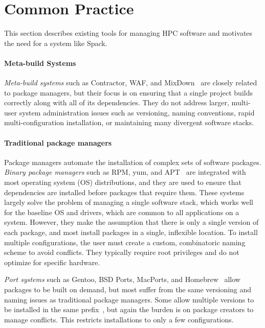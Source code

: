 
\section{Common Practice}
\label{sec:motivation}

This section describes existing tools for managing HPC 
software and motivates the need for a system like Spack.

\paragraph{Meta-build Systems}

{\it Meta-build systems} such as Contractor, WAF, and
MixDown~\cite{amundson:contractor,epperly+:mixdown,nagy:waf} are closely
related to package managers, but their focus is on ensuring that a single
project builds correctly along with all of its dependencies.  They do not address
larger, multi-user system administration issues such as versioning, naming
conventions, rapid multi-configuration installation, or maintaining many
divergent software stacks.

\paragraph{Traditional package managers}
Package managers automate the installation of complex sets of software packages.
{\it Binary package managers} such as RPM, yum, and  
APT~\cite{foster+:rpm03,silva:apt01,yum} are integrated with most
operating system (OS) distributions, and they are used to ensure that dependencies
are installed before packages that require them.
These systems largely solve the problem of managing a single software
stack, which works well for the baseline OS and drivers, which are 
common to all applications on a system.
However, they make the assumption that there is only a single version
of each package, and most install packages in a single, inflexible location.
To install multiple configurations, the user must create a custom, combinatoric
naming scheme to avoid conflicts. They typically require root 
privileges and do not optimize for specific hardware.

{\it Port systems} such as Gentoo, BSD Ports, MacPorts, and 
Homebrew~\cite{bsdports,groffen:gentoo-prefix,homebrew,macports,thiruvathukal:gentoo04}
allow packages to be built on demand, but most suffer from 
the same versioning and naming issues as traditional package managers.
Some allow multiple versions to be installed in the same
prefix~\cite{groffen:gentoo-prefix}, but again the burden is on package
creators to manage conflicts. This restricts installations to only a few
configurations.


